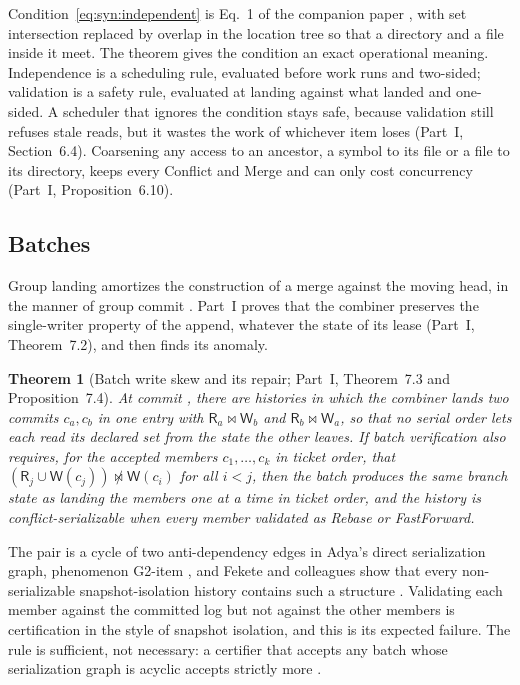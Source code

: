 \documentclass[11pt,letterpaper]{article}
\newtheorem{theorem}{Theorem}[section]
\theoremstyle{definition}
\theoremstyle{remark}
\newcommand{\R}{\mathsf{R}}
\newcommand{\W}{\mathsf{W}}
\newcommand{\meets}{\bowtie}
\newcommand{\nmeets}{\not\bowtie}
\begin{document}
Condition~\eqref{eq:syn:independent} is Eq.~1 of the companion paper \cite{long2026inversion}, with set intersection replaced by overlap in the location tree so that a directory and a file inside it meet. The theorem gives the condition an exact operational meaning. Independence is a scheduling rule, evaluated before work runs and two-sided; validation is a safety rule, evaluated at landing against what landed and one-sided. A scheduler that ignores the condition stays safe, because validation still refuses stale reads, but it wastes the work of whichever item loses (Part~I, Section~6.4). Coarsening any access to an ancestor, a symbol to its file or a file to its directory, keeps every Conflict and Merge and can only cost concurrency (Part~I, Proposition~6.10).

\subsection{Batches}

Group landing amortizes the construction of a merge against the moving head, in the manner of group commit \cite{dewitt1984main}. Part~I proves that the combiner preserves the single-writer property of the append, whatever the state of its lease (Part~I, Theorem~7.2), and then finds its anomaly.

\begin{theorem}[Batch write skew and its repair; Part~I, Theorem~7.3 and Proposition~7.4]
\label{thm:syn:batch}
At commit , there are histories in which the combiner lands two commits $c_a,c_b$ in one entry with $\R_a\meets\W_b$ and $\R_b\meets\W_a$, so that no serial order lets each read its declared set from the state the other leaves. If batch verification also requires, for the accepted members $c_1,\dots,c_k$ in ticket order, that $(\R_j\cup\W(c_j))\nmeets\W(c_i)$ for all $i<j$, then the batch produces the same branch state as landing the members one at a time in ticket order, and the history is conflict-serializable when every member validated as Rebase or FastForward.
\end{theorem}

The pair is a cycle of two anti-dependency edges in Adya's direct serialization graph, phenomenon G2-item \cite{adya1999thesis}, and Fekete and colleagues show that every non-serializable snapshot-isolation history contains such a structure \cite{fekete2005serializable}. Validating each member against the committed log but not against the other members is certification in the style of snapshot isolation, and this is its expected failure. The rule is sufficient, not necessary: a certifier that accepts any batch whose serialization graph is acyclic accepts strictly more \cite{bhg1987}.
\end{document}
